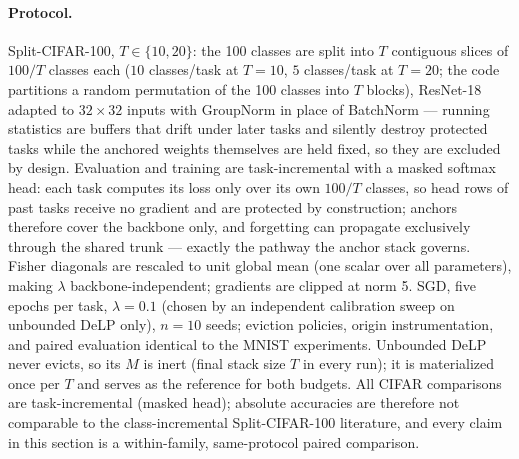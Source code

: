 \documentclass[review,12pt,number]{elsarticle}
\newcommand{\delp}{DeLP}
\begin{document}
\paragraph{Protocol.}
Split-CIFAR-100, $T \in \{10, 20\}$: the 100 classes are split into
$T$ contiguous slices of $100/T$ classes each ($10$ classes/task at
$T{=}10$, $5$ classes/task at $T{=}20$; the code partitions a
random permutation of the 100 classes into $T$ blocks), ResNet-18
adapted to $32{\times}32$ inputs with GroupNorm in place of BatchNorm
--- running statistics are buffers that drift under later tasks and
silently destroy protected tasks while the anchored weights themselves
are held fixed, so they are excluded by design. Evaluation and training
are task-incremental with a masked softmax head: each task computes its
loss only over its own $100/T$ classes, so head rows of past tasks receive
no gradient and are protected by construction; anchors therefore cover
the backbone only, and forgetting can propagate exclusively through
the shared trunk --- exactly the pathway the anchor stack governs.
Fisher diagonals are rescaled to unit global mean (one scalar over all
parameters), making $\lambda$ backbone-independent; gradients are
clipped at norm 5. SGD, five epochs per task, $\lambda{=}0.1$ (chosen
by an independent calibration sweep on unbounded \delp{} only),
$n{=}10$ seeds; eviction policies, origin instrumentation, and paired
evaluation identical to the MNIST experiments. Unbounded \delp{} never
evicts, so its $M$ is inert (final stack size $T$ in every run); it is
materialized once per $T$ and serves as the reference for both
budgets. All CIFAR comparisons are task-incremental (masked head);
absolute accuracies are therefore not comparable to the
class-incremental Split-CIFAR-100 literature, and every claim in this
section is a within-family, same-protocol paired comparison.
\end{document}
